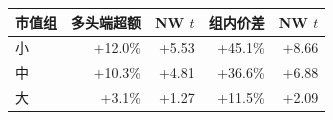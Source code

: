 \begin{tabular}{@{}lrrrr@{}}
\toprule
市值组 & 多头端超额 & NW $t$ & 组内价差 & NW $t$ \\
\midrule
小 & +12.0\% & +5.53 & +45.1\% & +8.66 \\
中 & +10.3\% & +4.81 & +36.6\% & +6.88 \\
大 & +3.1\% & +1.27 & +11.5\% & +2.09 \\
\bottomrule
\end{tabular}

